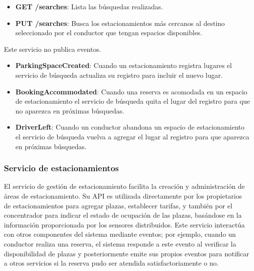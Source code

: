 
\begin{itemize}
    \item \textbf{GET /searches}: Lista las búsquedas realizadas.
    \item \textbf{PUT /searches}: Busca los estacionamientos más cercanos al destino seleccionado por el conductor que tengan espacios disponibles.
\end{itemize}

Este servicio no publica eventos.

\begin{itemize}
    \item \textbf{ParkingSpaceCreated}: Cuando un estacionamiento registra lugares el servicio de búsqueda actualiza su registro para incluir el nuevo lugar.
    \item \textbf{BookingAccommodated}: Cuando una reserva es acomodada en un espacio de estacionamiento el servicio de búsqueda quita el lugar del registro para que no aparezca en próximas búsquedas.
    \item \textbf{DriverLeft}: Cuando un conductor abandona un espacio de estacionamiento el servicio de búsqueda vuelva a agregar el lugar al registro para que aparezca en próximas búsquedas.
\end{itemize}



\subsubsection{Servicio de estacionamientos}
El servicio de gestión de estacionamiento facilita la creación y administración de áreas de estacionamiento. Su API es utilizada directamente por los propietarios de estacionamientos para agregar plazas, establecer tarifas, y también por el concentrador para indicar el estado de ocupación de las plazas, basándose en la información proporcionada por los sensores distribuidos. Este servicio interactúa con otros componentes del sistema mediante eventos; por ejemplo, cuando un conductor realiza una reserva, el sistema responde a este evento al verificar la disponibilidad de plazas y posteriormente emite sus propios eventos para notificar a otros servicios si la reserva pudo ser atendida satisfactoriamente o no.


